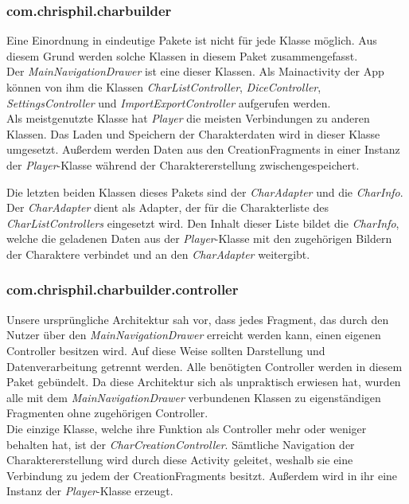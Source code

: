 \subsubsection{com.chrisphil.charbuilder}
Eine Einordnung in eindeutige Pakete ist nicht für jede Klasse möglich. Aus diesem Grund werden solche Klassen in diesem Paket zusammengefasst.\\

Der \textit{MainNavigationDrawer} ist eine dieser Klassen. Als Mainactivity der App können von ihm die Klassen \textit{CharListController}, \textit{DiceController}, \textit{SettingsController} und \textit{ImportExportController} aufgerufen werden.\\

Als meistgenutzte Klasse hat \textit{Player} die meisten Verbindungen zu anderen Klassen. Das Laden und Speichern der Charakterdaten wird in dieser Klasse umgesetzt. Außerdem werden Daten aus den \grqq CreationFragments\grqq{} in einer Instanz der \textit{Player}-Klasse während der Charaktererstellung zwischengespeichert. 

Die letzten beiden Klassen dieses Pakets sind der \textit{CharAdapter} und die \textit{CharInfo}. Der \textit{CharAdapter} dient als Adapter, der für die Charakterliste des \textit{CharListControllers} eingesetzt wird. Den Inhalt dieser Liste bildet die \textit{CharInfo}, welche die geladenen Daten aus der \textit{Player}-Klasse mit den zugehörigen Bildern der Charaktere verbindet und an den \textit{CharAdapter} weitergibt.

\subsubsection{com.chrisphil.charbuilder.controller}
Unsere ursprüngliche Architektur sah vor, dass jedes Fragment, das durch den Nutzer über den \textit{MainNavigationDrawer} erreicht werden kann, einen eigenen Controller besitzen wird. Auf diese Weise sollten Darstellung und Datenverarbeitung getrennt werden. Alle benötigten Controller werden in diesem Paket gebündelt. Da diese Architektur sich als unpraktisch erwiesen hat, wurden alle mit dem \textit{MainNavigationDrawer} verbundenen Klassen zu eigenständigen Fragmenten ohne zugehörigen Controller.\\

Die einzige Klasse, welche ihre Funktion als Controller mehr oder weniger behalten hat, ist der \textit{CharCreationController}. Sämtliche Navigation der Charaktererstellung wird durch diese Activity geleitet, weshalb sie eine Verbindung zu jedem der \grqq CreationFragments\grqq{} besitzt. Außerdem wird in ihr eine Instanz der \textit{Player}-Klasse erzeugt.


